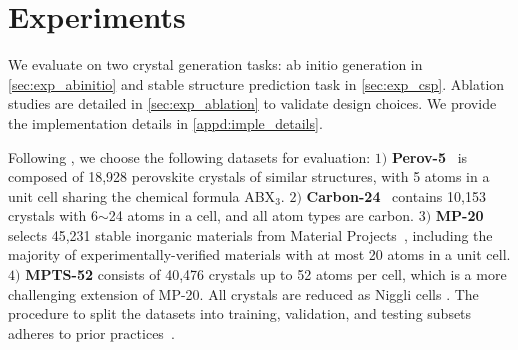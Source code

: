 \section{Experiments}\label{sec:exp}
We evaluate on two crystal generation tasks: ab initio generation in \cref{sec:exp_abinitio} and stable structure prediction task in \cref{sec:exp_csp}. Ablation studies are detailed in \cref{sec:exp_ablation} to validate design choices. We provide the implementation details in \cref{appd:imple_details}.

Following \citet{xie2021crystal,jiao2023crystal}, we choose the following datasets for evaluation: $1)$ \textbf{Perov-5}~\citep{castelli2012new, castelli2012computational} is composed of 18,928 perovskite crystals of similar structures, with 5 atoms in a unit cell sharing the chemical formula ABX$_3$. $2)$ \textbf{Carbon-24}~\citep{carbon2020data} contains 10,153 crystals with 6$\sim$24 atoms in a cell, and all atom types are carbon. $3)$ \textbf{MP-20}~\citep{jain2013commentary} selects 45,231 stable inorganic materials from Material Projects~\citep{jain2013commentary}, including the majority of experimentally-verified materials with at most 20 atoms in a unit cell. $4)$ \textbf{MPTS-52} \citep{jiao2023crystal} consists of 40,476 crystals up to 52 atoms per cell, which is a more challenging extension of MP-20. All crystals are reduced as Niggli cells \citep{nigglicell}. The procedure to split the datasets into training, validation, and testing subsets adheres to prior practices~\citep{xie2021crystal,jiao2023crystal}. 

